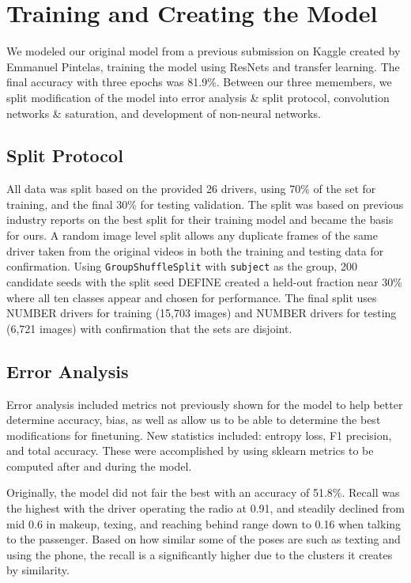 \section{Training and Creating the Model}
\label{sec:formatting}

We modeled our original model from a previous submission on Kaggle created by Emmanuel Pintelas, training the model using ResNets and transfer learning. 
The final accuracy with three epochs was 81.9\%. Between our three memembers, we split modification of the model into error analysis \& split protocol, convolution networks \& saturation, and development of non-neural networks.

\subsection{Split Protocol}

All data was split based on the provided 26 drivers, using 70\% of the set for training, and the final 30\% for testing validation.
The split was based on previous industry reports\cite{maDigitalTwin2024} on the best split for their training model and became the basis for ours.
A random image level split allows any duplicate frames of the same driver taken from the original videos in both the training and testing data for confirmation.
Using \verb+GroupShuffleSplit+ with \verb+subject+ as the group, 200 candidate seeds with the split seed DEFINE created a held-out fraction near 30\% where all ten classes appear and chosen for performance.
The final split uses NUMBER drivers for training (15,703 images) and NUMBER drivers for testing (6,721 images) with confirmation that the sets are disjoint.



\subsection{Error Analysis}

Error analysis included metrics not previously shown for the model to help better determine accuracy, bias, as well as allow us to be able to determine the best modifications for finetuning.
New statistics included: entropy loss, F1 precision, and total accuracy. These were accomplished by using sklearn metrics to be computed after and during the model.

Originally, the model did not fair the best with an accuracy of 51.8\%. 
Recall was the highest with the driver operating the radio at 0.91, and steadily declined from mid 0.6 in makeup, texing, and reaching behind range down to 0.16 when talking to the passenger.
Based on how similar some of the poses are such as texting and using the phone, the recall is a significantly higher due to the clusters it creates by similarity.

